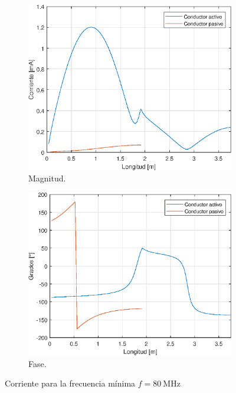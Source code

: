 \begin{figure}[H]
\begin{subfigure}{0.5\textwidth}
		\includegraphics[scale=0.6]{imagenes/i_mag_80_tierra.eps}
		\caption{Magnitud.}
	\end{subfigure}
	\quad
	\begin{subfigure}{0.5\textwidth}
		\includegraphics[scale=0.6]{imagenes/i_fase_80_tierra.eps}
		\caption{Fase.}
	\end{subfigure}
	\caption{Corriente para la frecuencia mínima $f = \SI{80}{\mega\hertz}$}
\end{figure}

